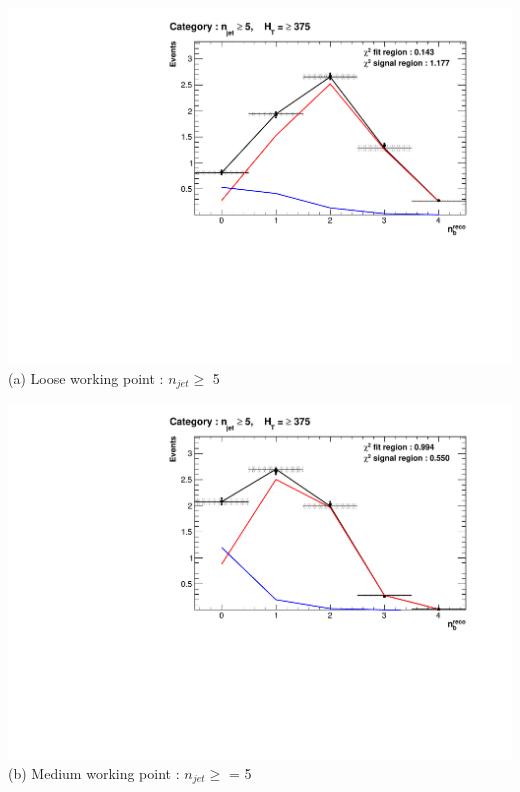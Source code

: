 \begin{minipage}{\textwidth}
\footnotesize
\vspace{5mm}
\centering
\begin{minipage}{.51\textwidth}
\centering
\includegraphics[width = 1.0\linewidth]{plots/ThesisPlots/Final_Fit_To_MC_Normal_Loose_HTBin_OneMuon_Template_375_jet_mult_5.pdf}
\centering (a) Loose working point : $n_{jet} \geq$  5 
\end{minipage}
\quad
\begin{minipage}[b]{0.51\linewidth}
\includegraphics[width = 1.0\linewidth]{plots/ThesisPlots/Final_Fit_To_MC_Normal_Medium_HTBin_OneMuon_Template_375_jet_mult_5.pdf}
\centering (b) Medium working point : $n_{jet} \geq$ = 5 
\end{minipage}
\end{minipage}

